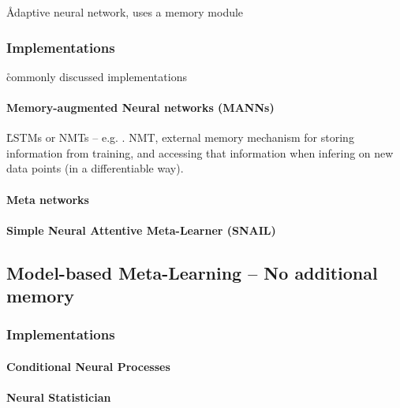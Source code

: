 \r{Adaptive neural network, uses a memory module}


\subsubsection{Implementations}

\r{commonly discussed implementations}

\paragraph{Memory-augmented Neural networks (MANNs)}

\r{LSTMs or NMTs -- e.g. \cite{santoro2016meta}. NMT, external memory mechanism for storing information from training, and accessing that information when infering on new data points (in a differentiable way).}

\paragraph{Meta networks}


\paragraph{Simple Neural Attentive Meta-Learner (SNAIL)}


\subsection{Model-based Meta-Learning -- No additional memory}

\subsubsection{Implementations}

\paragraph{Conditional Neural Processes}


\paragraph{Neural Statistician}

